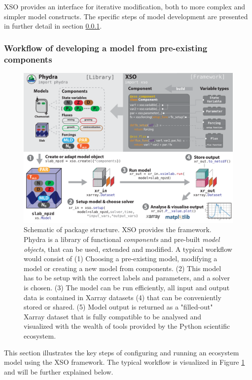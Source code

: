 \documentclass[journal abbreviation, manuscript]{copernicus}
\begin{document}
XSO provides an interface for iterative modification, both to more complex and simpler model constructs. The specific steps of model development are presented in further detail in section \ref{Section:ModelDevelopmentWorkflow}.

\subsubsection{Workflow of developing a model from pre-existing components} \label{Section:ModelDevelopmentWorkflow}
%
\begin{figure}[t]
\includegraphics[width=12cm]{Figures/firstdraft_schematics/00_schematics_Package.pdf}
\caption{Schematic of package structure. XSO provides the framework. Phydra is a library of functional \textit{components} and pre-built \textit{model objects}, that can be used, extended and modified. A typical workflow would consist of (1) Choosing a pre-existing model, modifying a model or creating a new model from components. (2) This model has to be setup with the correct labels and parameters, and a solver is chosen. (3) The model can be run efficiently, all input and output data is contained in Xarray datasets (4)  that can be conveniently stored or shared. (5) Model output is returned as a "filled-out" Xarray dataset that is fully compatible to be analysed and visualized with the wealth of tools provided by the Python scientific ecosystem.}
\label{Figure:PhydraXSOPackageSchematics}
\end{figure}

This section illustrates the key steps of configuring and running an ecosystem model using the XSO framework. The typical workflow is visualized in Figure \ref{Figure:PhydraXSOPackageSchematics} and will be further explained below.
\end{document}
